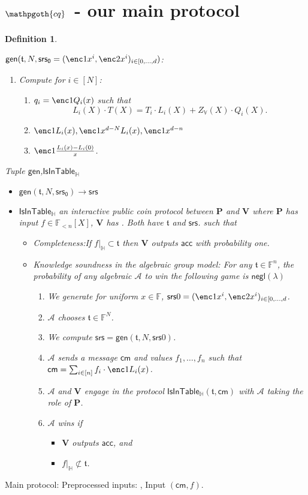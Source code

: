 \documentclass[11pt]{article} %
\newcommand{\cq}{\ensuremath{\mathpgoth{cq} }\xspace}
\newcommand{\F}{\ensuremath{\mathbb F}\xspace}
\newcommand{\adv}{\ensuremath{\mathcal A}\xspace}
\newcommand{\srs}{\ensuremath{\mathsf{srs}}\xspace}
\newcommand{\srsbase}{\ensuremath{\mathsf{srs_0}}\xspace}
\newcommand{\cm}{\ensuremath{\mathsf{cm}}\xspace}
\newcommand{\negl}{\ensuremath{\mathsf{negl}(\lambda)}\xspace}
\newcommand{\acc}{\ensuremath{\mathsf{acc}}\xspace}
\newcommand{\gen}{\ensuremath{\mathsf{gen}}\xspace}
\newcommand{\prv}{\ensuremath{\mathsf{\mathbf{P}}}\xspace}
\newcommand{\ver}{\ensuremath{\mathsf{\mathbf{V}}}\xspace}
\newcommand{\polysofdeg}[1]{\ensuremath{\F_{< #1}[X]}\xspace}
\newcommand{\sumi}[1]{\sum_{i\in[#1]}}
\newtheorem{dfn}[lemma]{Definition}
\newcommand{\restricttoset}[2]{\ensuremath{#1|_{#2}}\xspace}
\newcommand{\isintable}{\ensuremath{\mathsf{IsInTable_{\subspace}}}\xspace}
\newcommand{\subspace}{\ensuremath{\mathbb{H}}\xspace}
\newcommand{\bigspace}{\ensuremath{\mathbb{V}}\xspace}
\newcommand{\witsize}{\ensuremath{n}\xspace}
\newcommand{\tabsize}{\ensuremath{N}\xspace}
\newcommand{\tab}{\ensuremath{\mathfrak{t}}\xspace}
\begin{document}
\section{$\cq\;$ - our main protocol}
\begin{dfn}\label{dfn:lookupprot}


$\gen(\tab,\tabsize,\srsbase=(\enc1{x^i},\enc2{x^i})_{i\in [0,\ldots,d})$:
\begin{enumerate}
 \item Compute for $i\in [\tabsize]$:
 \begin{enumerate}
  \item $q_i=\enc1{Q_i(x)}$ such that
  \[L_i(X)\cdot T(X)=T_i\cdot L_i(X) + Z_\bigspace(X)\cdot Q_i(X).\]
  \item $\enc1{L_i(x)},\enc1{x^{d-\tabsize}L_i(x)},\enc1{x^{d-\witsize}}$
  \item $\enc1{\frac{L_i(x)-L_i(0)}{x}}$.
 \end{enumerate}

\end{enumerate}


Tuple \gen,\isintable
\begin{itemize}
 \item $\gen(\tab,\tabsize,\srsbase)\to \srs$
 \item $\isintable$ an interactive public coin protocol between \prv and \ver where \prv has input $f\in \polysofdeg{\witsize}$, \ver has .
 Both have \tab and \srs.
 such that
 \begin{itemize}
  \item Completeness:If $\restricttoset{f}{\subspace}\subset \tab$ then \ver outputs \acc with probability one.
  \item Knowledge soundness in the algebraic group model:
   For any $\tab\in\F^\witsize$, the probability of any algebraic \adv to win the following game is \negl

\begin{enumerate}
\item We generate for uniform $x\in \F$, $\srs0=(\enc1{x^i},\enc2{x^i})_{i\in [0,\ldots,d}$.
\item \adv chooses  $\tab\in \F^\tabsize$.
 \item We compute $\srs=\gen(\tab,\tabsize,\srs0)$.
 \item \adv sends a message \cm and values $f_1,\ldots, f_\witsize$ such that $\cm=\sumi{\witsize}f_i\cdot \enc1{L_i(x)}$.
 \item \adv and \ver engage in the protocol $\isintable(\tab,\cm)$ with \adv taking the role of \prv.
 \item \adv wins if 
 \begin{itemize}
  \item \ver outputs \acc, and
  \item $\restricttoset{f}{\subspace}\not\subset \tab$.
 \end{itemize}

\end{enumerate}
\end{itemize}
\end{itemize}
\end{dfn}
Main protocol:
Preprocessed inputs:
\enc2{Z_\bigspace(x)}, 
Input $(\cm,f)$.
\end{document}
